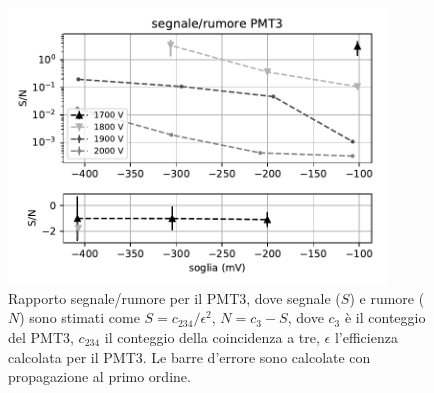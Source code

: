 \documentclass[a4paper]{article}
\begin{document}
\begin{figure}
	\centering
	\includegraphics[width=10cm]{SN3}
	\caption{%
	\label{fig:sn3}%
	Rapporto segnale/rumore per il PMT3,
	dove segnale ($S$) e rumore ($N$) sono stimati come
	$S=c_{234}/\epsilon^2$,
	$N=c_3 - S$,
	dove $c_3$ è il conteggio del PMT3,
	$c_{234}$ il conteggio della coincidenza a tre,
	$\epsilon$ l'efficienza calcolata per il PMT3.
	Le barre d'errore sono calcolate con propagazione al primo ordine.}
\end{figure}
\end{document}
